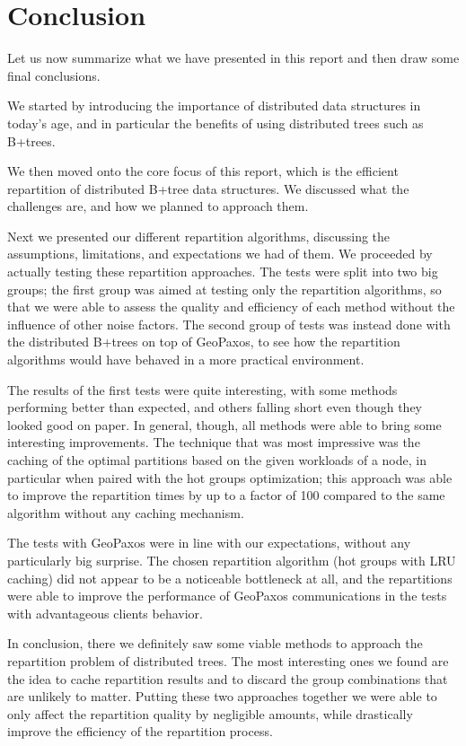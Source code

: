 \chapter{Conclusion}\label{sec:Conclusion}
Let us now summarize what we have presented in this report and then draw some final conclusions.

We started by introducing the importance of distributed data structures in today's age, and in particular the benefits of using distributed trees such as B+trees. 

We then moved onto the core focus of this report, which is the efficient repartition of distributed B+tree data structures. We discussed what the challenges are, and how we planned to approach them.

Next we presented our different repartition algorithms, discussing the assumptions, limitations, and expectations we had of them. We proceeded by actually testing these repartition approaches. The tests were split into two big groups; the first group was aimed at testing only the repartition algorithms, so that we were able to assess the quality and efficiency of each method without the influence of other noise factors. The second group of tests was instead done with the distributed B+trees on top of GeoPaxos, to see how the repartition algorithms would have behaved in a more practical environment.

The results of the first tests were quite interesting, with some methods performing better than expected, and others falling short even though they looked good on paper. In general, though, all methods were able to bring some interesting improvements. The technique that was most impressive was the caching of the optimal partitions based on the given workloads of a node, in particular when paired with the hot groups optimization; this approach was able to improve the repartition times by up to a factor of 100 compared to the same algorithm without any caching mechanism. 

The tests with GeoPaxos were in line with our expectations, without any particularly big surprise. The chosen repartition algorithm (hot groups with LRU caching) did not appear to be a noticeable bottleneck at all, and the repartitions were able to improve the performance of GeoPaxos communications in the tests with advantageous clients behavior.

In conclusion, there we definitely saw some viable methods to approach the repartition problem of distributed trees. The most interesting ones we found are the idea to cache repartition results and to discard the group combinations that are unlikely to matter. Putting these two approaches together we were able to only affect the repartition quality by negligible amounts, while drastically improve the efficiency of the repartition process.

